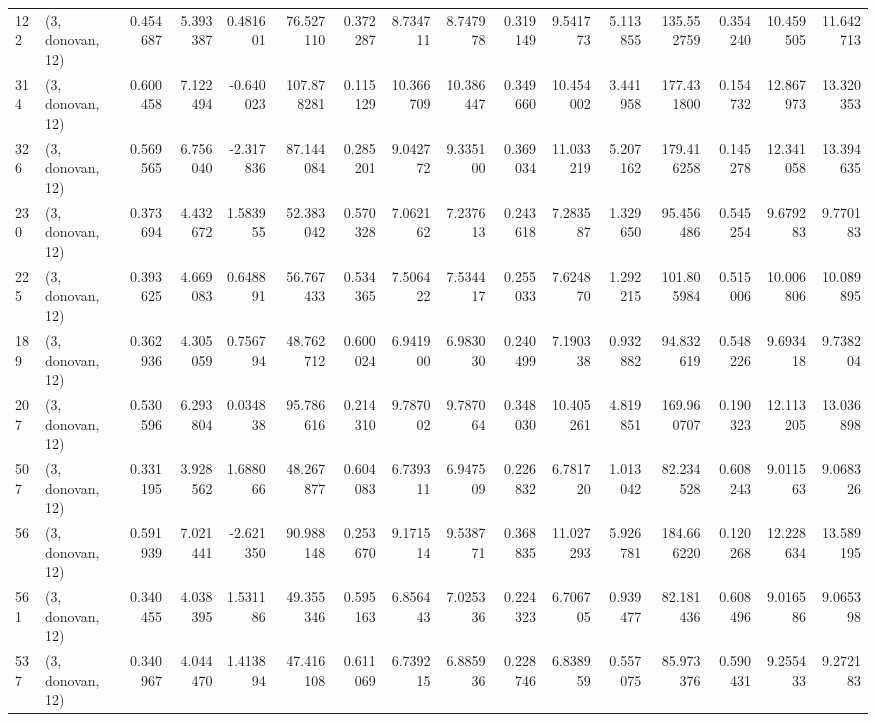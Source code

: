 \begin{tabular}{llrrrrrrrrrrrrrr}
122 &  (3, donovan, 12) &   0.454687 &   5.393387 &   0.481601 &    76.527110 &   0.372287 &   8.734711 &   8.747978 &  0.319149 &   9.541773 &   5.113855 &    135.552759 &   0.354240 &   10.459505 &   11.642713 \\
314 &  (3, donovan, 12) &   0.600458 &   7.122494 &  -0.640023 &   107.878281 &   0.115129 &  10.366709 &  10.386447 &  0.349660 &  10.454002 &   3.441958 &    177.431800 &   0.154732 &   12.867973 &   13.320353 \\
326 &  (3, donovan, 12) &   0.569565 &   6.756040 &  -2.317836 &    87.144084 &   0.285201 &   9.042772 &   9.335100 &  0.369034 &  11.033219 &   5.207162 &    179.416258 &   0.145278 &   12.341058 &   13.394635 \\
230 &  (3, donovan, 12) &   0.373694 &   4.432672 &   1.583955 &    52.383042 &   0.570328 &   7.062162 &   7.237613 &  0.243618 &   7.283587 &   1.329650 &     95.456486 &   0.545254 &    9.679283 &    9.770183 \\
225 &  (3, donovan, 12) &   0.393625 &   4.669083 &   0.648891 &    56.767433 &   0.534365 &   7.506422 &   7.534417 &  0.255033 &   7.624870 &   1.292215 &    101.805984 &   0.515006 &   10.006806 &   10.089895 \\
189 &  (3, donovan, 12) &   0.362936 &   4.305059 &   0.756794 &    48.762712 &   0.600024 &   6.941900 &   6.983030 &  0.240499 &   7.190338 &   0.932882 &     94.832619 &   0.548226 &    9.693418 &    9.738204 \\
207 &  (3, donovan, 12) &   0.530596 &   6.293804 &   0.034838 &    95.786616 &   0.214310 &   9.787002 &   9.787064 &  0.348030 &  10.405261 &   4.819851 &    169.960707 &   0.190323 &   12.113205 &   13.036898 \\
507 &  (3, donovan, 12) &   0.331195 &   3.928562 &   1.688066 &    48.267877 &   0.604083 &   6.739311 &   6.947509 &  0.226832 &   6.781720 &   1.013042 &     82.234528 &   0.608243 &    9.011563 &    9.068326 \\
56  &  (3, donovan, 12) &   0.591939 &   7.021441 &  -2.621350 &    90.988148 &   0.253670 &   9.171514 &   9.538771 &  0.368835 &  11.027293 &   5.926781 &    184.666220 &   0.120268 &   12.228634 &   13.589195 \\
561 &  (3, donovan, 12) &   0.340455 &   4.038395 &   1.531186 &    49.355346 &   0.595163 &   6.856443 &   7.025336 &  0.224323 &   6.706705 &   0.939477 &     82.181436 &   0.608496 &    9.016586 &    9.065398 \\
537 &  (3, donovan, 12) &   0.340967 &   4.044470 &   1.413894 &    47.416108 &   0.611069 &   6.739215 &   6.885936 &  0.228746 &   6.838959 &   0.557075 &     85.973376 &   0.590431 &    9.255433 &    9.272183 \\

\end{tabular}
